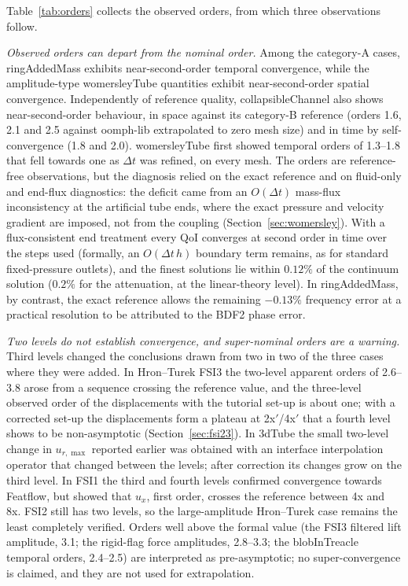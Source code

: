 Table~\ref{tab:orders} collects the observed orders, from which three observations follow.

\emph{Observed orders can depart from the nominal order.}
Among the category-A cases, ringAddedMass exhibits near-second-order temporal convergence, while the amplitude-type womersleyTube quantities exhibit near-second-order spatial convergence.
Independently of reference quality, collapsibleChannel also shows near-second-order behaviour, in space against its category-B reference (orders 1.6, 2.1 and 2.5 against oomph-lib extrapolated to zero mesh size) and in time by self-convergence (1.8 and 2.0).
womersleyTube first showed temporal orders of 1.3--1.8 that fell towards one as $\Delta t$ was refined, on every mesh.
The orders are reference-free observations, but the diagnosis relied on the exact reference and on fluid-only and end-flux diagnostics: the deficit came from an $O(\Delta t)$ mass-flux inconsistency at the artificial tube ends, where the exact pressure and velocity gradient are imposed, not from the coupling (Section~\ref{sec:womersley}).
With a flux-consistent end treatment every QoI converges at second order in time over the steps used (formally, an $O(\Delta t\,h)$ boundary term remains, as for standard fixed-pressure outlets), and the finest solutions lie within $0.12\%$ of the continuum solution ($0.2\%$ for the attenuation, at the linear-theory level).
In ringAddedMass, by contrast, the exact reference allows the remaining $-0.13\%$ frequency error at a practical resolution to be attributed to the BDF2 phase error.

\emph{Two levels do not establish convergence, and super-nominal orders are a warning.}
Third levels changed the conclusions drawn from two in two of the three cases where they were added.
In Hron--Turek FSI3 the two-level apparent orders of 2.6--3.8 arose from a sequence crossing the reference value, and the three-level observed order of the displacements with the tutorial set-up is about one; with a corrected set-up the displacements form a plateau at 2x$'$/4x$'$ that a fourth level shows to be non-asymptotic (Section~\ref{sec:fsi23}).
In 3dTube the small two-level change in $u_{r,\max}$ reported earlier was obtained with an interface interpolation operator that changed between the levels; after correction its changes grow on the third level.
In FSI1 the third and fourth levels confirmed convergence towards Featflow, but showed that $u_x$, first order, crosses the reference between 4x and 8x. FSI2 still has two levels, so the large-amplitude Hron--Turek case remains the least completely verified.
Orders well above the formal value (the FSI3 filtered lift amplitude, 3.1; the rigid-flag force amplitudes, 2.8--3.3; the blobInTreacle temporal orders, 2.4--2.5) are interpreted as pre-asymptotic; no super-convergence is claimed, and they are not used for extrapolation.

